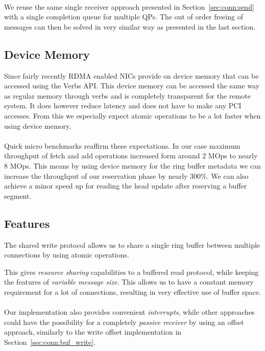 \paragraph{} We reuse the same single receiver approach presented in Section~\ref{sec:conn:send} with a single completion queue for multiple
QPs. The out of order freeing of messages can then be solved in very similar way as presented in the last section.


\subsection{Device Memory}
Since fairly recently RDMA enabled NICs provide on device memory that can be accessed using the Verbs API. This device memory can 
be accessed the same way as regular memory through verbs and is completely transparent for the remote system. It does however
reduce latency and does not have to make any PCI accesses. From this we especially expect atomic operations to be a lot faster
when using device memory.

\paragraph{} Quick micro benchmarks reaffirm these expectations. In our case maximum throughput of fetch and add operations 
increased form around 2 MOps to nearly 8 MOps. This means by using device memory for the ring buffer metadata we can increase
the throughput of our reservation phase by nearly 300\%. We can also achieve a minor speed up for reading the head update after
reserving a buffer segment.


\subsection{Features}

The shared write protocol allows us to share a single ring buffer between multiple connections by using atomic operations.

This gives \emph{resource sharing} capabilities to a buffered read protocol, while keeping the features of 
\emph{variable message size}. This allows us to have a constant memory requirement for a lot of connections,
resulting in very effective use of buffer space.


\paragraph{} Our implementation also provides convenient \emph{interrupts}, while other approaches could have the possibility 
for a completely \emph{passive receiver} by using an offset approach, similarly to the write offset implementation in 
Section~\ref{sec:conn:buf_write}.

